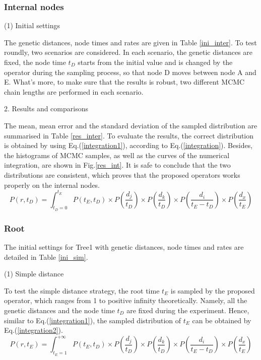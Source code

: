\documentclass{bmcart}
\begin{document}
\subsubsection*{Internal nodes}
(1) Initial settings

The genetic distances, node times and rates are given in Table \ref{ini_inter}. To test roundly, two scenarios are considered. In each scenario, the genetic distances are fixed, the node time $t_D$ starts from the initial value and is changed by the operator during the sampling process, so that node D moves between node A and E. What's more, to make sure that the results is robust, two different MCMC chain lengths are performed in each scenario. 

2. Results and comparisons

The mean, mean error and the standard deviation of the sampled distribution are summarised in Table \ref{res_inter}. To evaluate the results, the correct distribution is obtained by using Eq.(\ref{integration1}), according to Eq.(\ref{integration}). Besides, the histograms of MCMC samples, as well as the curves of the numerical integration, are shown in Fig.\ref{res_int}. It is safe to conclude that the two distributions are consistent, which proves that the proposed operators works properly on the internal nodes.
\begin{equation}
\label{integration1}
P(r,{t_D}) = \int_{{t_D} = 0}^{{t_E}} {P({t_E},{t_D}) \times P(\frac{{{d_j}}}{{{t_D}}}) \times P(\frac{{{d_k}}}{{{t_D}}}) \times P(\frac{{{d_i}}}{{{t_E} - {t_D}}}) \times P(\frac{{{d_x}}}{{{t_E}}})} 
\end{equation}
\subsubsection*{Root}

The initial settings for Tree1 with genetic distances, node times and rates are detailed in Table \ref{ini_sim}. 

(1) Simple distance

To test the simple distance strategy, the root time $t_E$ is sampled by the proposed operator, which ranges from 1 to positive infinity theoretically. Namely, all the genetic distances and the node time $t_D$  are fixed during the experiment. Hence, similar to Eq.(\ref{integration1}), the sampled distribution of $t_E$ can be obtained by Eq.(\ref{integration2}).
\begin{equation}
\label{integration2}
P(r,{t_E}) = \int_{{t_E} = 1}^{ + \infty } {P({t_E},{t_D}) \times P(\frac{{{d_j}}}{{{t_D}}}) \times P(\frac{{{d_k}}}{{{t_D}}}) \times P(\frac{{{d_i}}}{{{t_E} - {t_D}}}) \times P(\frac{{{d_x}}}{{{t_E}}})} 
\end{equation}
\end{document}
